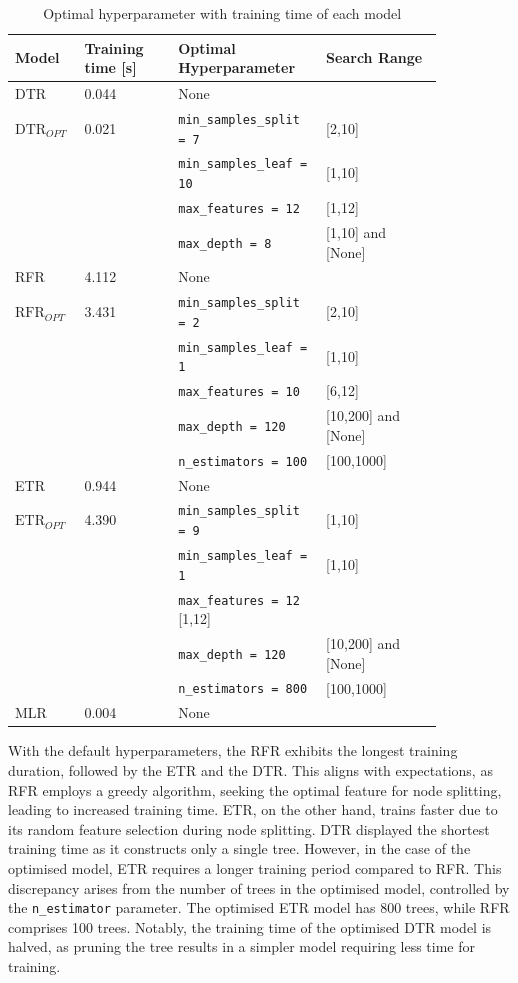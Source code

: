 \begin{table}[h!]
    \footnotesize
    \centering
    {\begin{tabular}{ p{0.1\linewidth} p{0.2\linewidth}  p{0.3\linewidth} p{0.25\linewidth}}
    \hline
    Model & Training time [s] &  Optimal Hyperparameter & Search Range \\
    \hline
    DTR & 0.044 & None \\
    $\text{DTR}_{OPT}$ & 0.021  & {\tt min\_samples\_split = 7} & [2,10] \\
    &&{\tt min\_samples\_leaf = 10} & [1,10] \\
    &&{\tt max\_features = 12} & [1,12]\\
    &&{\tt max\_depth = 8} & [1,10] and [None]\\
    RFR & 4.112 & None \\
    $\text{RFR}_{OPT}$ & 3.431  & {\tt min\_samples\_split = 2} & [2,10]\\
    &&{\tt min\_samples\_leaf = 1} & [1,10]\\
    &&{\tt max\_features = 10} & [6,12]\\
    &&{\tt max\_depth = 120} & [10,200] and [None]\\
    &&{\tt n\_estimators = 100} & [100,1000]\\
    ETR & 0.944 & None \\
    $\text{ETR}_{OPT}$ & 4.390  & {\tt min\_samples\_split = 9} & [1,10]\\
    &&{\tt min\_samples\_leaf = 1} & [1,10]\\
    &&{\tt max\_features = 12} [1,12]\\
    &&{\tt max\_depth = 120} & [10,200] and [None]\\
    &&{\tt n\_estimators = 800} & [100,1000]\\
    MLR & 0.004  & None\\
    \hline
    \end{tabular}}
\caption{Optimal hyperparameter with training time of each model}\label{tbl:hpo_optimal}
\end{table}

With the default hyperparameters, the RFR exhibits the longest training duration, followed by the ETR and the DTR. This aligns with expectations, as RFR employs a greedy algorithm, seeking the optimal feature for node splitting, leading to increased training time. ETR, on the other hand, trains faster due to its random feature selection during node splitting. DTR displayed the shortest training time as it constructs only a single tree. However, in the case of the optimised model, ETR requires a longer training period compared to RFR. This discrepancy arises from the number of trees in the optimised model, controlled by the {\tt n\_estimator} parameter. The optimised ETR model has 800 trees, while RFR comprises 100 trees. Notably, the training time of the optimised DTR model is halved, as pruning the tree results in a simpler model requiring less time for training.\\

